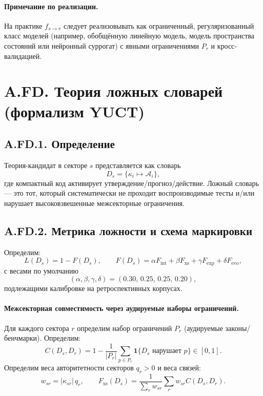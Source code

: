 \documentclass[11pt,a4paper]{article}
\newcommand{\abs}[1]{\left|#1\right|}
\newcommand{\indicator}{\mathbf{1}}
\begin{document}
	\paragraph{Примечание по реализации.}
	На практике $f_{s\to r}$ следует реализовывать как ограниченный, регуляризованный класс моделей (например, обобщённую линейную модель, модель пространства состояний или нейронный суррогат) с явными ограничениями $P_r$ и кросс-валидацией.
	
	\section*{A.FD. Теория ложных словарей (формализм YUCT)}
	
	\subsection*{A.FD.1. Определение}
	Теория-кандидат в секторе $s$ представляется как словарь
	\[
	D_s=\{\kappa_i\mapsto \mathcal{A}_i\},
	\]
	где компактный код активирует утверждение/прогноз/действие. Ложный словарь — это тот, который систематически не проходит воспроизводимые тесты и/или нарушает высоковзвешенные межсекторные ограничения.
	
	\subsection*{A.FD.2. Метрика ложности и схема маркировки}
	Определим:
	\[
	L(D_s)=1-F(D_s),\qquad
	F(D_s)=\alpha F_{\mathrm{int}}+\beta F_{\mathrm{xs}}+\gamma F_{\mathrm{exp}}+\delta F_{\mathrm{evo}},
	\]
	с весами по умолчанию
	\[
	(\alpha,\beta,\gamma,\delta)=(0.30,\,0.25,\,0.25,\,0.20),
	\]
	подлежащими калибровке на ретроспективных корпусах.
	
	\paragraph{Межсекторная совместимость через аудируемые наборы ограничений.}
	Для каждого сектора $r$ определим набор ограничений $P_r$ (аудируемые законы/бенчмарки). Определим:
	\[
	C(D_s,D_r)=1-\frac{1}{|P_r|}\sum_{p\in P_r}\indicator\{D_s\text{ нарушает }p\}\in[0,1].
	\]
	Определим веса авторитетности секторов $q_r>0$ и веса связей:
	\[
	w_{sr}=\abs{\kappa_{sr}}\,q_r,\qquad
	F_{\mathrm{xs}}(D_s)=\frac{1}{\sum_r w_{sr}}\sum_{r}w_{sr}C(D_s,D_r).
	\]
	
\end{document}
